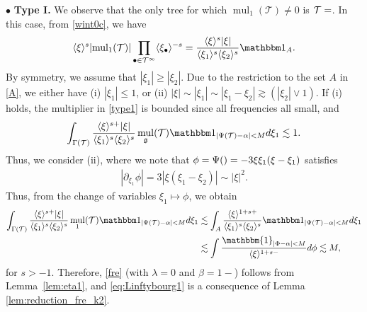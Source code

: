 \documentclass[%
11pt,  reqno]{amsart}
\makeatletter
\newcommand{\fia}{\mathbbm{1}_{|\Phi-\alpha|<M}}
\newcommand{\jap}[1]{\langle #1 \rangle}
\newcommand{\5}{\textup{V}}
\newcommand{\noi}{\noindent}
\newcommand{\ind}{\mathbbm 1}
\newcommand{\les}{\lesssim}
\theoremstyle{remark}
\newcommand{\bul}{\bullet}
\newcommand{\TT}{\mathcal{T}}
\newcommand{\al}{\alpha}
\newcommand{\G}{\Gamma}
\newcommand{\gfrak}{\mathfrak{g}}
\newcommand{\ges}{\gtrsim}
\newcommand{\jb}[1]
{\langle #1 \rangle}
\DeclareMathOperator{\mul}{mul}
\def\<#1>{\csname MH@symb@#1\endcsname}
\numberwithin{equation}{section}
\numberwithin{theorem}{section}
\makeatother
\begin{document}




\smallskip 
\noi
$\bul$ \textbf{Type I.} We observe that the only tree for which $\mul_1(\TT)\neq 0$ is $\TT=\<1>$. In this case, from \eqref{wint0c}, we have
\begin{align}\label{type1}
\jap{\xi}^s
| {\mul}_1(\TT) | 
\prod_{\bul\in \TT^\infty} \jap{\xi_\bul}^{-s}
= 
\frac{\jap{\xi}^s |\xi|}{\jap{\xi_1}^s \jap{\xi_2}^s} \ind_{A}.
\end{align}
By symmetry, we assume that $|\xi_1| \ge |\xi_2|$.
Due to the restriction to the set $A$ in \eqref{A}, we either have (i) $|\xi_1| \le 1$, or (ii) $|\xi| \sim |\xi_1| \sim | \xi_1 - \xi_2 | \ges (|\xi_2| \lor 1)$. 
If (i) holds, the multiplier in \eqref{type1} is bounded since all frequencies all small, and 
$$
\int_{\Gamma(\TT)}\frac{ \jb{\xi}^{s+ } |\xi| }{\jb{\xi_1}^s \jb{\xi_2}^s } \mul_{\gfrak} (\TT) \ind_{|\Psi(\TT) - \al| < M }d\xi_1 \lesssim 1.
$$
Thus, we consider (ii), where we note that $\phi = \Psi(\<1>) = -3 \xi \xi_1(\xi-\xi_1)$ satisfies
\begin{align}
| \partial_{\xi_1} \phi | = 3 | \xi (\xi_1 - \xi_2)| \sim |\xi|^2.
\end{align}
 Thus, from the change of variables $\xi_1 \mapsto \phi $, we obtain
	\begin{align*}
\int_{\G(\TT)} \frac{ \jb{\xi}^{s+ } |\xi| }{\jb{\xi_1}^s \jb{\xi_2}^s } \mul_{1} (\TT) \ind_{|\Psi(\TT) - \al| < M }d\xi_1
 &
\les 
\int_{A} \frac{\jap{\xi}^{1 + s + }}{\jap{\xi_{1}}^{s}\jap{\xi_{2}}^{s}} \ind_{|\Psi(\TT) - \al| < M } d\xi_{1} 
\\&\les 
 \int \frac{\fia }{ \jap{\xi}^{1 + s- }} d\phi \lesssim M, 
	\end{align*}
	for $s>-1$. Therefore, \eqref{fre} (with $\lambda=0$ and $\beta=1-$) follows from Lemma~\ref{lem:eta1}, and \eqref{eq:Linftybourg1} is a consequence of Lemma \ref{lem:reduction_fre_k2}.
\end{document}
